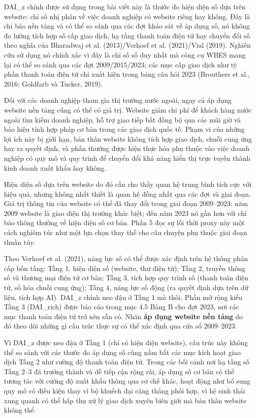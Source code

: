 \documentclass[12pt,a4paper]{article}
\begin{document}
DAI\_z chính được sử dụng trong bài viết này là thước đo hiện diện số
dựa trên website: chỉ số nhị phân về việc doanh nghiệp có website riêng
hay không. Đây là chỉ báo nền tảng và có thể so sánh qua các đợt khảo
sát về áp dụng số, nó không đo lường tích hợp số cấp giao dịch, hạ tầng
thanh toán điện tử hay chuyển đổi số theo nghĩa của Bharadwaj et al.
(2013)/Verhoef et al. (2021)/Vial (2019). Nghiên cứu sử dụng nó chính
xác vì đây là chỉ số số duy nhất mà công cụ WBES mang lại có thể so sánh
qua các đợt 2009/2015/2023; các mục cấp giao dịch như tỷ phần thanh toán
điện tử chỉ xuất hiện trong bảng câu hỏi 2023 (Brouthers et al., 2016;
Goldfarb và Tucker, 2019).

Đối với các doanh nghiệp tham gia thị trường nước ngoài, ngay cả áp dụng
website nền tảng cũng có thể có giá trị. Website giảm chi phí để khách
hàng nước ngoài tìm kiếm doanh nghiệp, hỗ trợ giao tiếp bất đồng bộ qua
các múi giờ và báo hiệu tính hợp pháp cơ bản trong các giao dịch quốc
tế. Phạm vi của những lợi ích này bị giới hạn, bản thân website không
tích hợp giao dịch, chuỗi cung ứng hay ra quyết định, và phần thưởng
được hiện thực hóa phụ thuộc vào việc doanh nghiệp có quy mô và quy
trình để chuyển đổi khả năng hiển thị trực tuyến thành kinh doanh xuất
khẩu hay không.

Hiện diện số dựa trên website do đó cần cho thấy quan hệ trung bình tích
cực với hiệu quả, nhưng không nhất thiết là quan hệ đồng nhất qua các
đợt và giai đoạn. Giá trị thông tin của website có thể đã thay đổi trong
giai đoạn 2009--2023: năm 2009 website là giao diện thị trường khác
biệt; đến năm 2023 nó gần hơn với chỉ báo thông thường về hiện diện số
cơ bản. Phần 5 đọc sự lỗi thời proxy này một cách nghiêm túc như một lựa
chọn thay thế cho câu chuyện phụ thuộc giai đoạn thuần túy.

Theo Verhoef et al. (2021), năng lực số có thể được xác định trên hệ
thống phân cấp bốn tầng: Tầng 1, hiện diện số (website, thư điện tử);
Tầng 2, truyền thông số và thương mại điện tử cơ bản; Tầng 3, tích hợp
quy trình số (thanh toán điện tử, số hóa chuỗi cung ứng); Tầng 4, năng
lực số động (ra quyết định dựa trên dữ liệu, tích hợp AI). DAI\_z chính
neo đậu ở Tầng 1 mà thôi. Phần mở rộng kiểu Tầng 3 (DAI\_rich) được báo
cáo trong mục 4.5 Bảng B cho đợt 2023, nơi các mục thanh toán điện tử
trở nên sẵn có. Nhãn \textbf{áp dụng website nền tảng} do đó theo dõi
những gì cấu trúc thực sự có thể xác định qua cửa sổ 2009--2023.

Vì DAI\_z được neo đậu ở Tầng 1 (chỉ có hiện diện website), cấu trúc này
không thể so sánh với các thước đo áp dụng số cũng nắm bắt các mục kích
hoạt giao dịch Tầng 2 như cường độ thanh toán điện tử. Trong các bối
cảnh nơi hạ tầng số Tầng 2--3 đã trưởng thành và dễ tiếp cận rộng rãi,
áp dụng số cơ bản có thể tương tác với cường độ xuất khẩu thông qua cơ
chế khác, hoạt động như bổ sung quy mô có điều kiện thay vì bộ khuếch
đại căng thẳng phối hợp, vì hệ sinh thái xung quanh có thể hấp thụ xử lý
giao dịch xuyên biên giới mà bản thân website không thể.
\end{document}
